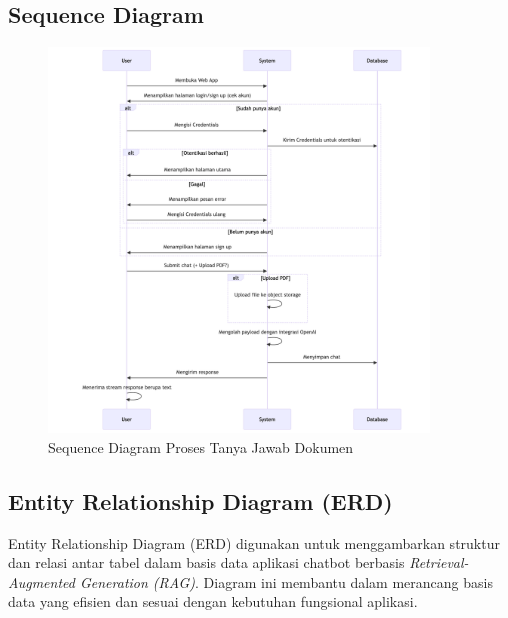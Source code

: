 \subsection{Sequence Diagram}
\begin{figure}[H]
  \centering
  \includegraphics[width=0.9\textwidth]{images/bab-3/sequence.png}
  \caption{Sequence Diagram Proses Tanya Jawab Dokumen}
  \label{fig:sequence}
\end{figure}

\subsection{Entity Relationship Diagram (ERD)}

Entity Relationship Diagram (ERD) digunakan untuk menggambarkan struktur dan relasi antar tabel dalam basis data aplikasi chatbot berbasis \textit{Retrieval-Augmented Generation (RAG)}. Diagram ini membantu dalam merancang basis data yang efisien dan sesuai dengan kebutuhan fungsional aplikasi.

